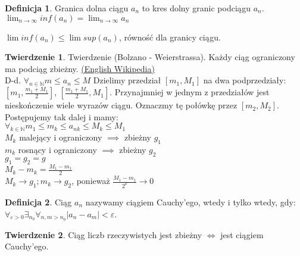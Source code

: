 \documentclass{article}
\theoremstyle{definition}
\newtheorem{de}{Definicja}[subsection]
\theoremstyle{definition}
\newtheorem{tw}{Twierdzenie}[subsection]
\theoremstyle{definition}
\theoremstyle{definition}
\begin{document}
\begin{de}
Granica dolna ciągu $a_n$ to kres dolny granic podciągu $a_n$.\\
$\lim_{n\rightarrow \infty} inf(a_n) = \lim_{n\rightarrow\infty} a_n$
\end{de}

$\lim inf(a_n)\leq \lim sup(a_n)$, równość dla granicy ciągu.

\begin{tw}
Twierdzenie (Bolzano - Weierstrassa). Każdy ciąg ograniczony ma podciąg zbieżny.
\href{https://en.wikipedia.org/wiki/Bolzano%E2%80%93Weierstrass_theorem}{(English Wikipedia)}\\
D-d. $\forall_{n\in\mathbb{N}} m \leq a_n \leq M$ Dzielimy przedział $[m_1,M_1]$ na dwa podprzedziały:
$[m_1, \frac{m_1+M_1}{2}]$, $[\frac{m_1+M_1}{2},M_1]$. Przynajmniej w jednym z przedziałów jest nieskończenie wiele wyrazów ciągu.
Oznaczmy tę połówkę przez $[m_2, M_2]$. Postępujemy tak dalej i mamy:\\
$\forall_{k\in\mathbb{N}} m_1\leq m_k\leq a_{nk} \leq M_k \leq M_1$\\
$M_k$ malejący i ograniczony $\implies$ zbieżny $g_1$\\
$m_k$ rosnący i ograniczony $\implies$ zbieżny $g_2$\\
$g_1=g_2=g$\\
$M_k-m_k=\frac{M_1-m_1}{2}$\\
$M_k\rightarrow g_1; m_k\rightarrow g_2$, ponieważ $\frac{M_1-m_1}{2^k}\rightarrow 0$

\end{tw}

\begin{de}
Ciąg $a_n$ nazywamy ciągiem Cauchy'ego, wtedy i tylko wtedy, gdy:\\
$\forall_{\varepsilon > 0}\exists_{n_0}\forall_{n,m>n_0} |a_n-a_m|<\varepsilon$.
\end{de}

\begin{tw}
Ciąg liczb rzeczywistych jest zbieżny $\iff$ jest ciągiem Cauchy'ego.
\end{tw}
\end{document}
